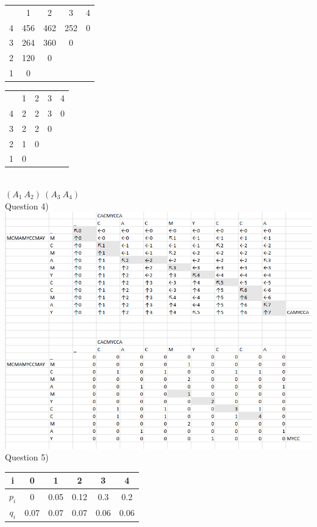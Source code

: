 \documentclass{article}
\begin{document}
    \begin{tabular}{ c | c | c | c | c }
            
        & 1 & 2 & 3 & 4 \\ 
    4 & 456 & 462 & 252 & 0 \\  
    3 & 264 & 360 & 0 \\
    2 & 120 & 0 \\
    1 & 0     
    \end{tabular}
    \begin{tabular}{ c | c | c | c | c }
            
        & 1 & 2 & 3 & 4 \\ 
      4 & 2 & 2 & 3 & 0 \\  
      3 & 2 & 2 & 0 \\
      2 & 1 & 0 \\
      1 & 0     
    \end{tabular}\\
 $ (A_{1} \  A_{2}) \  (A_{3} \ A_{4}) $\\
 Question 4)   \\
    \includegraphics[scale=0.5]{subsequence.png}
Question 5)\\
\begin{tabular}{ c | c | c | c | c | c}         
          i & 0 & 1 & 2 & 3 & 4 \\ 
\hline    $p_{i}$ & 0 & 0.05 & 0.12 & 0.3 & 0.2 \\  
\hline    $q_{i}$ & 0.07 & 0.07 & 0.07 & 0.06 & 0.06 \\
\end{tabular}
\\\\
\end{document}
